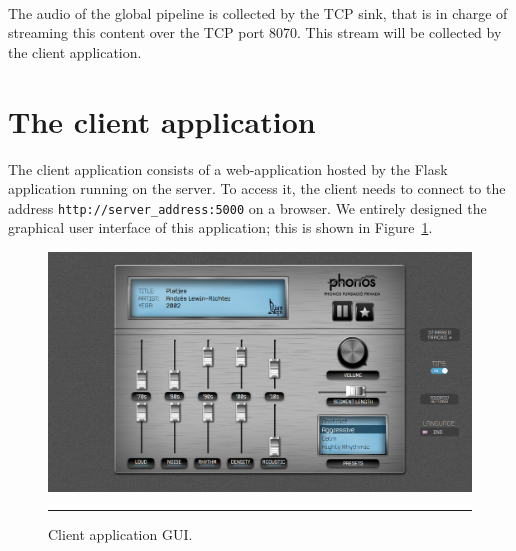 \\The audio of the global pipeline is collected by the TCP sink, that is in charge of streaming this content over the TCP port 8070. This stream will be collected by the client application.

\section{The client application}
\label{sec:rtclient}
The client application consists of a web-application hosted by the Flask application running on the server. To access it, the client needs to connect to the address \texttt{http://server\_address:5000} on a browser. We entirely designed the graphical user interface of this application; this is shown in Figure~\ref{fig:gui1}.

\begin{figure}[h]
\hskip -0.8cm
\includegraphics[scale=0.34]{Figures/gui1.png}
    \rule{27em}{0.5pt}
  \caption[Client application user interface]{Client application GUI.}
  \label{fig:gui1}

\end{figure}

